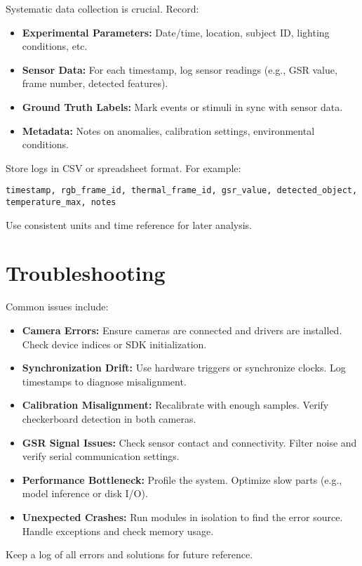 \documentclass{article}
\begin{document}
    Systematic data collection is crucial. Record:
    \begin{itemize}
        \item \textbf{Experimental Parameters:} Date/time, location, subject ID, lighting conditions, etc.
        \item \textbf{Sensor Data:} For each timestamp, log sensor readings (e.g., GSR value, frame number, detected features).
        \item \textbf{Ground Truth Labels:} Mark events or stimuli in sync with sensor data.
        \item \textbf{Metadata:} Notes on anomalies, calibration settings, environmental conditions.
    \end{itemize}
    Store logs in CSV or spreadsheet format. For example:
    \begin{verbatim}
timestamp, rgb_frame_id, thermal_frame_id, gsr_value, detected_object, temperature_max, notes
    \end{verbatim}
    Use consistent units and time reference for later analysis.


    \section{Troubleshooting}

    Common issues include:
    \begin{itemize}
        \item \textbf{Camera Errors:} Ensure cameras are connected and drivers are installed. Check device indices or SDK initialization.
        \item \textbf{Synchronization Drift:} Use hardware triggers or synchronize clocks. Log timestamps to diagnose misalignment.
        \item \textbf{Calibration Misalignment:} Recalibrate with enough samples. Verify checkerboard detection in both cameras.
        \item \textbf{GSR Signal Issues:} Check sensor contact and connectivity. Filter noise and verify serial communication settings.
        \item \textbf{Performance Bottleneck:} Profile the system. Optimize slow parts (e.g., model inference or disk I/O).
        \item \textbf{Unexpected Crashes:} Run modules in isolation to find the error source. Handle exceptions and check memory usage.
    \end{itemize}
    Keep a log of all errors and solutions for future reference.
\end{document}
